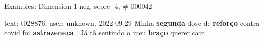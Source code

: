 \begin{frame}{Examples: Dimension 1 neg, score -4, \# 000042}
\footnotesize
\begin{alertblock}{text: t028876, user: unknown, 2022-09-29}
Minha \textbf{segunda} dose de \textbf{reforço} contra covid foi 
\textbf{astrazeneca} . Já tô sentindo o meu \textbf{braço} querer cair. 
\end{alertblock}
\end{frame}
